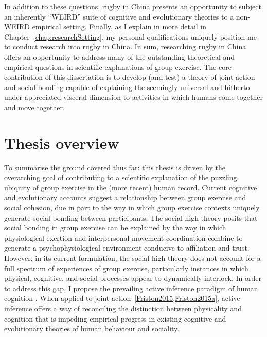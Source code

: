 \begin{CJK}{UTF8}{gbsn}
In addition to these questions, rugby in China presents an opportunity to subject an inherently ``WEIRD'' \citep[Western, Educated, Industrial, Rich, and Democratic; cf.][]{Henrich2010d} suite of cognitive and evolutionary theories to a non-WEIRD empirical setting.  Finally, as I explain in more detail in Chapter~\ref{chap:researchSetting}, my personal qualifications uniquely position me to conduct research into rugby in China.  In sum, researching rugby in China offers an opportunity to address many of the outstanding theoretical and empirical questions in scientific explanations of group exercise.  The core contribution of this dissertation is to develop (and test) a theory of joint action and social bonding capable of explaining the seemingly universal and hitherto under-appreciated visceral dimension to activities in which humans come together and move together.


\section{Thesis overview}
To summarise the ground covered thus far: this thesis is driven by the overarching goal of contributing to a scientific explanation of the puzzling ubiquity of group exercise in the (more recent) human record. Current cognitive and evolutionary accounts suggest a relationship between group exercise and social cohesion, due in part to the way in which group exercise contexts uniquely generate social bonding between participants.  The social high theory posits that social bonding in group exercise can be explained by the way in which physiological exertion and interpersonal movement coordination combine to generate a psychophysiological environment conducive to affiliation and trust.  However, in its current formulation, the social high theory does not account for a full spectrum of experiences of group exercise, particularly instances in which physical, cognitive, and social processes appear to dynamically interlock. In order to address this gap, I propose the prevailing active inference paradigm of human cognition \citep{Friston2010}. When applied to joint action~\ref{Friston2015,Friston2015a}, active inference offers a way of reconciling the distinction between physicality and cognition that is impeding empirical progress in existing cognitive and evolutionary theories of human behaviour and sociality.


\end{CJK}
